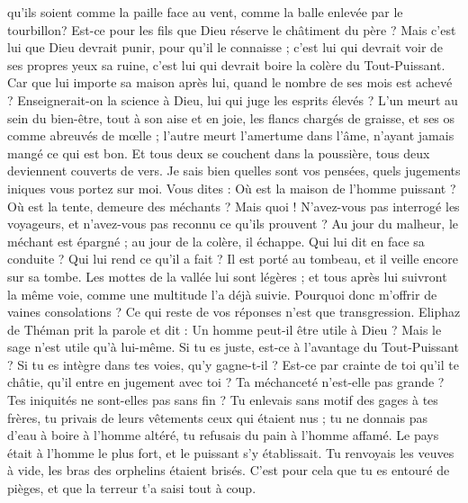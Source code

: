 \begin{multicols}{2}
qu'ils soient comme la paille face au vent, comme la balle enlevée par le tourbillon?
Est-ce pour les fils que Dieu réserve le châtiment du père ? Mais c'est lui que Dieu devrait punir, pour qu'il le connaisse ;
c'est lui qui devrait voir de ses propres yeux sa ruine, c'est lui qui devrait boire la colère du Tout-Puissant.
Car que lui importe sa maison après lui, quand le nombre de ses mois est achevé ?
Enseignerait-on la science à Dieu, lui qui juge les esprits élevés ?
L'un meurt au sein du bien-être, tout à son aise et en joie,
les flancs chargés de graisse, et ses os comme abreuvés de mœlle ;
l'autre meurt l'amertume dans l'âme, n'ayant jamais mangé ce qui est bon.
Et tous deux se couchent dans la poussière, tous deux deviennent couverts de vers.
Je sais bien quelles sont vos pensées, quels jugements iniques vous portez sur moi.
Vous dites : Où est la maison de l'homme puissant ? Où est la tente, demeure des méchants ?
Mais quoi ! N'avez-vous pas interrogé les voyageurs, et n'avez-vous pas reconnu ce qu'ils prouvent ?
Au jour du malheur, le méchant est épargné ; au jour de la colère, il échappe.
Qui lui dit en face sa conduite ? Qui lui rend ce qu'il a fait ?
Il est porté au tombeau, et il veille encore sur sa tombe.
Les mottes de la vallée lui sont légères ; et tous après lui suivront la même voie, comme une multitude l'a déjà suivie.
Pourquoi donc m'offrir de vaines consolations ? Ce qui reste de vos réponses n'est que transgression.
\VerseOne{}Eliphaz de Théman prit la parole et dit :
Un homme peut-il être utile à Dieu ? Mais le sage n'est utile qu'à lui-même.
Si tu es juste, est-ce à l'avantage du Tout-Puissant ? Si tu es intègre dans tes voies, qu'y gagne-t-il ?
Est-ce par crainte de toi qu'il te châtie, qu'il entre en jugement avec toi ?
Ta méchanceté n'est-elle pas grande ? Tes iniquités ne sont-elles pas sans fin ?
Tu enlevais sans motif des gages à tes frères, tu privais de leurs vêtements ceux qui étaient nus ;
tu ne donnais pas d'eau à boire à l'homme altéré, tu refusais du pain à l'homme affamé.
Le pays était à l'homme le plus fort, et le puissant s'y établissait.
Tu renvoyais les veuves à vide, les bras des orphelins étaient brisés.
C'est pour cela que tu es entouré de pièges, et que la terreur t'a saisi tout à coup.

\end{multicols}
